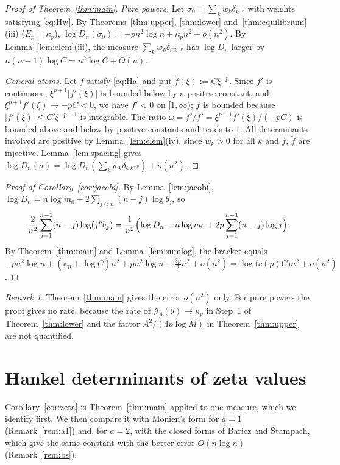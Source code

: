 \documentclass{amsart}
\theoremstyle{definition}
\theoremstyle{remark}
\newtheorem{remark}[theorem]{Remark}
\numberwithin{equation}{section}
\newcommand{\cJ}{\mathcal{J}}
\begin{document}
\begin{proof}[Proof of Theorem~\ref{thm:main}]
\emph{Pure powers.} Let $\sigma_0=\sum_kw_k\delta_{k^{-p}}$ with weights satisfying \eqref{eq:Hw}. By
Theorems~\ref{thm:upper}, \ref{thm:lower} and~\ref{thm:equilibrium}(iii) ($E_p=\kappa_p$),
$\log D_n(\sigma_0)=-pn^2\log n+\kappa_pn^2+o(n^2)$. By Lemma~\ref{lem:elem}(iii), the measure
$\sum_kw_k\delta_{Ck^{-p}}$ has $\log D_n$ larger by $n(n-1)\log C=n^2\log C+O(n)$.

\emph{General atoms.} Let $f$ satisfy \eqref{eq:Ha} and put $\tilde f(\xi):=C\xi^{-p}$. Since $f'$ is continuous,
$\xi^{p+1}|f'(\xi)|$ is bounded below by a positive constant, and $\xi^{p+1}f'(\xi)\to-pC<0$, we have $f'<0$ on
$[1,\infty)$; $f$ is bounded because $|f'(\xi)|\le C'\xi^{-p-1}$ is integrable. The ratio
$\omega=f'/\tilde f'=\xi^{p+1}f'(\xi)/(-pC)$ is bounded above and below by positive constants and tends to $1$. All
determinants involved are positive by Lemma~\ref{lem:elem}(iv), since $w_k>0$ for all $k$ and $f$, $\tilde f$ are injective.
Lemma~\ref{lem:spacing} gives $\log D_n(\sigma)=\log D_n(\sum_kw_k\delta_{Ck^{-p}})+o(n^2)$.
\end{proof}

\begin{proof}[Proof of Corollary~\ref{cor:jacobi}]
By Lemma~\ref{lem:jacobi}, $\log D_n=n\log m_0+2\sum_{j<n}(n-j)\log b_j$, so
\[
  \frac{2}{n^2}\sum_{j=1}^{n-1}(n-j)\log(j^pb_j)=\frac1{n^2}\Bigl(\log D_n-n\log m_0+2p\sum_{j=1}^{n-1}(n-j)\log j\Bigr).
\]
By Theorem~\ref{thm:main} and Lemma~\ref{lem:sumlog}, the bracket equals
$-pn^2\log n+(\kappa_p+\log C)n^2+pn^2\log n-\frac{3p}{2}n^2+o(n^2)=\log\bigl(c(p)C\bigr)n^2+o(n^2)$.
\end{proof}

\begin{remark}\label{rem:rate}
Theorem~\ref{thm:main} gives the error $o(n^2)$ only. For pure powers the proof gives no rate, because the rate of
$\cJ_p(\theta)\to\kappa_p$ in Step~1 of Theorem~\ref{thm:lower} and the factor $A^2/(4p\log M)$ in
Theorem~\ref{thm:upper} are not quantified.
\end{remark}

\section{Hankel determinants of zeta values}\label{sec:zeta}

Corollary~\ref{cor:zeta} is Theorem~\ref{thm:main} applied to one measure, which we identify first. We then compare it
with Monien's form for $a=1$ (Remark~\ref{rem:a1}) and, for $a=2$, with the closed forms of Baricz and
\v{S}tampach, which give the same constant with the better error $O(n\log n)$ (Remark~\ref{rem:bs}).
\end{document}
